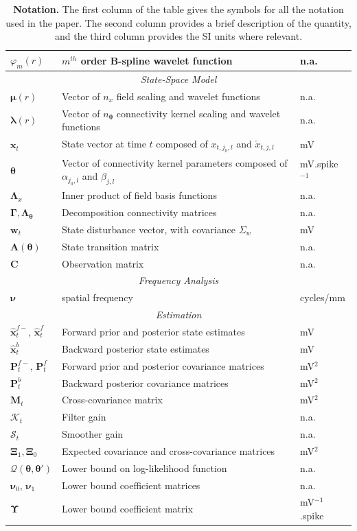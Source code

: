 \documentclass[review,authoryear,3p]{elsarticle}
\begin{document}
\begin{table}[!t]
\begin{tabular}{|l|l|l|}
	$\varphi_m(r)$&$m^{th}$ order B-spline wavelet function&n.a.\\
	\hline
	\multicolumn{3}{|c|}{\emph{State-Space Model}} \\
	\hline
		$\boldsymbol\mu(r)$&Vector of $n_x$ field scaling and wavelet functions&n.a.\\
		$\boldsymbol\lambda(r)$&Vector of $n_{\boldsymbol\theta}$ connectivity kernel scaling and wavelet functions&n.a.\\
   	$\mathbf{x}_t$ & State vector at time $t$ composed of  $x_{t,j_{0},l}$ and $\check{x}_{t,j,l}$ & mV\\ 
		$\boldsymbol\theta$&Vector of connectivity kernel parameters composed of $\alpha_{j_0,l}$ and $\beta_{j,l}$& mV.spike$^{-1}$\\ 
		$\boldsymbol{\Lambda}_x$&Inner product of field basis functions&n.a.\\
		$\boldsymbol\Gamma, \boldsymbol\Lambda_{\boldsymbol{\theta}}$&Decomposition connectivity matrices&n.a.\\
   	$\mathbf{w}_t$ & State disturbance vector, with covariance $\Sigma_w$ & mV\\ 
    $\mathbf{A}(\boldsymbol{\theta})$& State transition matrix& n.a.\\
   	$\mathbf{C}$ & Observation matrix & n.a. \\
	\hline
	\multicolumn{3}{|c|}{\emph{Frequency Analysis}} \\
	\hline
	$\boldsymbol{\nu}$& spatial frequency  & cycles/mm \\
	\hline
	\multicolumn{3}{|c|}{\emph{Estimation}} \\
	\hline
	$\hat{\mathbf{x}}_t^{f-}$, $\hat{\mathbf{x}}_t^f$ & Forward prior and posterior state estimates & mV\\
	$\hat{\mathbf{x}}_t^{b}$ & Backward posterior state estimates & mV\\
	$\mathbf P^{f-}_t$, $\mathbf P^f_t$  & Forward prior and posterior covariance matrices & mV$^2$\\
	$\mathbf P^b_t$ & Backward posterior covariance matrices & mV$^2$\\
	$\mathbf M_t$& Cross-covariance matrix & mV$^2$\\
	$\mathcal K_{t} $ & Filter gain & n.a.\\ 
	$\mathcal S_{t} $ & Smoother gain & n.a.\\ 
	$\boldsymbol\Xi_1, \boldsymbol\Xi_0$&Expected covariance and cross-covariance matrices& mV$^2$\\ 
	$\mathcal{Q}(\boldsymbol{\theta},\boldsymbol\theta')$&Lower bound on log-likelihood function&n.a.\\
	$\boldsymbol\nu_0$, $\boldsymbol\nu_1$&Lower bound coefficient matrices&n.a.\\ 
	$\boldsymbol\Upsilon$&Lower bound coefficient matrix&mV$^{-1}$.spike\\
	\hline
\end{tabular}
\caption{\textbf{Notation.} The first column of the table gives the symbols for all the notation used in the paper. The second column provides a brief description of the quantity, and the third column provides the SI units where relevant.}
\label{tab:Notation}
\end{table}  
\end{document}
